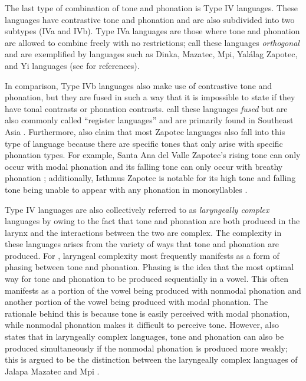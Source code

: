 The last type of combination of tone and phonation is Type IV languages. These languages have contrastive tone and phonation and are also subdivided into two subtypes (IVa and IVb). Type IVa languages are those where tone and phonation are allowed to combine freely with no restrictions; \citet{espositoCrosslinguisticPatternsPhonation2020} call these languages \textit{orthogonal} and are exemplified by languages such as Dinka, Mazatec, Mpi, Yalálag Zapotec, and Yi languages (see \cite{espositoCrosslinguisticPatternsPhonation2020} for references).

In comparison, Type IVb languages also make use of contrastive tone and phonation, but they are fused in such a way that it is impossible to state if they have tonal contrasts or phonation contrasts. \citet{espositoCrosslinguisticPatternsPhonation2020} call these languages \textit{fused} but are also commonly called ``register languages'' and are primarily found in Southeast Asia \citep{brunelleTonePhonationSoutheast2016,enfieldArealLinguisticsMainland2005,masicaDefiningLinguisticArea1976}. Furthermore, \citet{espositoCrosslinguisticPatternsPhonation2020} also claim that most Zapotec languages also fall into this type of language because there are specific tones that only arise with specific phonation types. For example, Santa Ana del Valle Zapotec's rising tone can only occur with modal phonation and its falling tone can only occur with breathy phonation \citep{espositoVariationContrastivePhonation2010}; additionally, Isthmus Zapotec is notable for its high tone and falling tone being unable to appear with any phonation in monosyllables \citep{pickettIsthmusJuchitanZapotec2010}. 

Type IV languages are also collectively referred to as \textit{laryngeally complex} languages by \citet{silvermanLaryngealComplexityOtomanguean1997,silvermanPhasingRecoverability1997} owing to the fact that tone and phonation are both produced in the larynx and the interactions between the two are complex. The complexity in these languages arises from the variety of ways that tone and phonation are produced. For \citeauthor{silvermanLaryngealComplexityOtomanguean1997}, laryngeal complexity most frequently manifests as a form of phasing between tone and phonation. Phasing is the idea that the most optimal way for tone and phonation to be produced sequentially in a vowel. This often manifests as a portion of the vowel being produced with nonmodal phonation and another portion of the vowel being produced with modal phonation. The rationale behind this is because tone is easily perceived with modal phonation, while nonmodal phonation makes it difficult to perceive tone. However, \citeauthor{silvermanLaryngealComplexityOtomanguean1997} also states that in laryngeally complex languages, tone and phonation can also be produced simultaneously if the nonmodal phonation is produced more weakly; this is argued to be the distinction between the laryngeally complex languages of Jalapa Mazatec and Mpi \citep{ladefogedSoundsWorldsLanguages1996,silvermanLaryngealComplexityOtomanguean1997}.  

